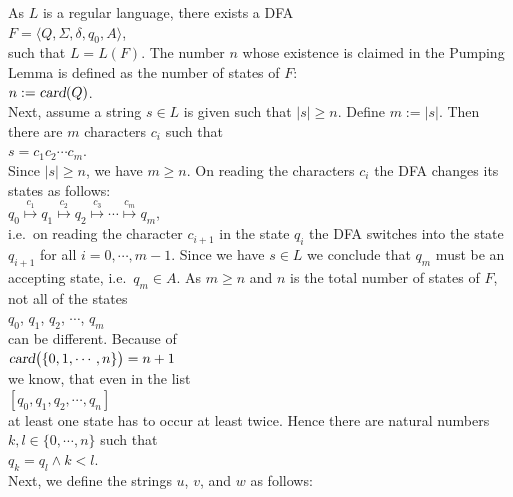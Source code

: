 \proofEng
As $L$ is a regular language, there exists a \textsc{DFA}
\\[0.2cm]
\hspace*{1.3cm}
$F = \langle Q, \Sigma, \delta, q_0, A \rangle$,
\\[0.2cm]
such that $L = L(F)$.  The number $n$ whose existence is claimed in the Pumping Lemma is defined as
the number of states of $F$: 
\\[0.2cm]
\hspace*{1.3cm}
$n := \textsl{card}(Q)$.
\\[0.2cm]
Next, assume a string $s \in L$ is given such that $|s| \geq n$.  Define $m := |s|$. Then there are $m$
characters $c_i$ such that
\\[0.2cm]
\hspace*{1.3cm}
$s = c_1 c_2 \cdots c_m$.
\\[0.2cm]
Since $|s| \geq n$, we have $m \geq n$.  On reading the characters $c_i$ the \textsc{DFA} changes its
states as follows:
\\[0.2cm]
\hspace*{1.3cm}
$q_0 \stackrel{c_1}{\longmapsto} q_1 \stackrel{c_2}{\longmapsto} q_2 \stackrel{c_3}{\longmapsto} \cdots \stackrel{c_m}{\longmapsto} q_m$,
\\[0.2cm]
i.e.~on reading the character $c_{i+1}$ in the state $q_i$ the \textsc{DFA} switches into the state $q_{i+1}$
for all $i=0,\cdots,m-1$.
Since we have  $s \in L$ we conclude that  $q_m$ must be an accepting state, i.e.~$q_m \in A$.
As $m \geq n$ and $n$ is the total number of states of $F$, not all of the states 
\\[0.2cm]
\hspace*{1.3cm}
$q_0$, $q_1$, $q_2$, $\cdots$, $q_m$
\\[0.2cm]
can be different.
Because of
\\[0.2cm]
\hspace*{1.3cm}
$\textsl{card}\bigl(\{0,1,\cdots,n\}\bigr) = n+1$
\\[0.2cm]
we know, that even in the list
\\[0.2cm]
\hspace*{1.3cm}
$[q_0,q_1,q_2,\cdots, q_{n}]$
\\[0.2cm]
at least one state has to occur at least twice.  Hence there are natural numbers $k, l \in \{0,\cdots,n\}$ such that
\\[0.2cm]
\hspace*{1.3cm}
$q_k = q_l \wedge k < l$.
\\[0.2cm]
Next, we define the strings $u$, $v$, and $w$ as follows:

